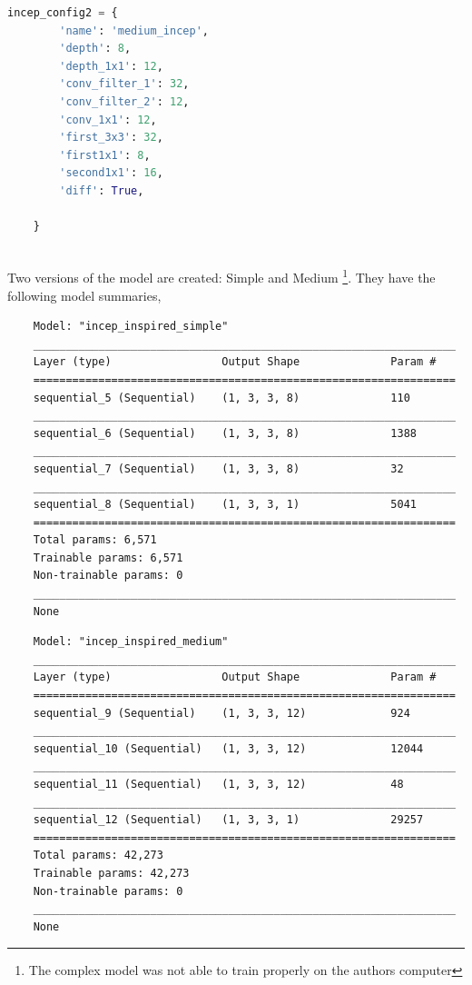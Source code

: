 \begin{lstlisting}[language=Python, label={lst:5}]
	incep_config2 = {
		'name': 'medium_incep',
		'depth': 8,
		'depth_1x1': 12,
		'conv_filter_1': 32,
		'conv_filter_2': 12,
		'conv_1x1': 12,
		'first_3x3': 32,
		'first1x1': 8,
		'second1x1': 16,
		'diff': True,
		
	}
	
\end{lstlisting}
Two versions of the model are created: Simple and Medium \footnote{The complex model was not able to train properly on the authors computer}.
They have the following model summaries,

\begin{verbatim}
	Model: "incep_inspired_simple"
	_________________________________________________________________
	Layer (type)                 Output Shape              Param #   
	=================================================================
	sequential_5 (Sequential)    (1, 3, 3, 8)              110       
	_________________________________________________________________
	sequential_6 (Sequential)    (1, 3, 3, 8)              1388      
	_________________________________________________________________
	sequential_7 (Sequential)    (1, 3, 3, 8)              32        
	_________________________________________________________________
	sequential_8 (Sequential)    (1, 3, 3, 1)              5041      
	=================================================================
	Total params: 6,571
	Trainable params: 6,571
	Non-trainable params: 0
	_________________________________________________________________
	None
\end{verbatim}

\begin{verbatim}
	Model: "incep_inspired_medium"
	_________________________________________________________________
	Layer (type)                 Output Shape              Param #   
	=================================================================
	sequential_9 (Sequential)    (1, 3, 3, 12)             924       
	_________________________________________________________________
	sequential_10 (Sequential)   (1, 3, 3, 12)             12044     
	_________________________________________________________________
	sequential_11 (Sequential)   (1, 3, 3, 12)             48        
	_________________________________________________________________
	sequential_12 (Sequential)   (1, 3, 3, 1)              29257     
	=================================================================
	Total params: 42,273
	Trainable params: 42,273
	Non-trainable params: 0
	_________________________________________________________________
	None
\end{verbatim}


